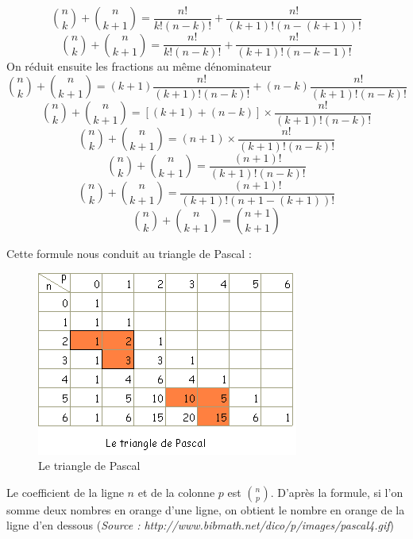 \newline

\begin{preuve}
$$\binom{n}{k} + \binom{n}{k+1} = \dfrac{n!}{k!(n-k)!} + \dfrac{n!}{(k+1)!(n-(k+1))!}$$
$$\binom{n}{k} + \binom{n}{k+1} = \dfrac{n!}{k!(n-k)!} + \dfrac{n!}{(k+1)!(n-k-1)!}$$
On réduit ensuite les fractions au même dénominateur
$$\binom{n}{k} + \binom{n}{k+1} = (k+1)\dfrac{n!}{(k+1)!(n-k)!} + (n-k)\dfrac{n!}{(k+1)!(n-k)!}$$
$$\binom{n}{k} + \binom{n}{k+1} = [(k+1) + (n-k)]\times \dfrac{n!}{(k+1)!(n-k)!}$$
$$\binom{n}{k} + \binom{n}{k+1} = (n+1)\times \dfrac{n!}{(k+1)!(n-k)!}$$
$$\binom{n}{k} + \binom{n}{k+1} = \dfrac{(n+1)!}{(k+1)!(n-k)!}$$
$$\binom{n}{k} + \binom{n}{k+1} = \dfrac{(n+1)!}{(k+1)!(n+1-(k+1))!}$$
$$\binom{n}{k} + \binom{n}{k+1} = \binom{n+1}{k+1}$$
\end{preuve}
Cette formule nous conduit au triangle de Pascal : 
\begin{figure}[H]
\centering
\includegraphics[scale=0.7]{images/pascal1.png}
\caption{Le triangle de Pascal}
\end{figure}
Le coefficient de la ligne $n$ et de la colonne $p$ est $\binom{n}{p}$. D'après la formule, si l'on somme deux nombres en orange d'une ligne, on obtient le nombre en orange de la ligne d'en dessous\newline
(\emph{Source : http://www.bibmath.net/dico/p/images/pascal4.gif})\newline

